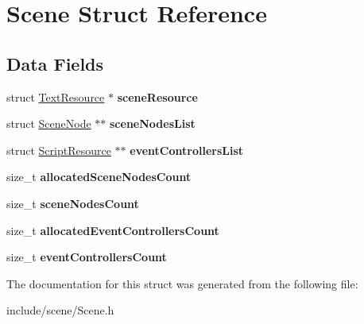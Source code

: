\hypertarget{struct_scene}{}\section{Scene Struct Reference}
\label{struct_scene}
\subsection*{Data Fields}
\begin{DoxyCompactItemize}
\item 
\hypertarget{struct_scene_a21ff815316283aacca9aa1a2946f2e44}{}\label{struct_scene_a21ff815316283aacca9aa1a2946f2e44} 
struct \hyperlink{struct_text_resource}{Text\+Resource} $\ast$ {\bfseries scene\+Resource}
\item 
\hypertarget{struct_scene_a5c2a731f55f56cdcfa5c21e60ccbb6e4}{}\label{struct_scene_a5c2a731f55f56cdcfa5c21e60ccbb6e4} 
struct \hyperlink{struct_scene_node}{Scene\+Node} $\ast$$\ast$ {\bfseries scene\+Nodes\+List}
\item 
\hypertarget{struct_scene_ad4b3987f8cf701755a371f80578a908d}{}\label{struct_scene_ad4b3987f8cf701755a371f80578a908d} 
struct \hyperlink{struct_script_resource}{Script\+Resource} $\ast$$\ast$ {\bfseries event\+Controllers\+List}
\item 
\hypertarget{struct_scene_a07444dae294959bed34558e3477a76c6}{}\label{struct_scene_a07444dae294959bed34558e3477a76c6} 
size\+\_\+t {\bfseries allocated\+Scene\+Nodes\+Count}
\item 
\hypertarget{struct_scene_a11cef9a0dcadd4d0fb4b18f1f214fed0}{}\label{struct_scene_a11cef9a0dcadd4d0fb4b18f1f214fed0} 
size\+\_\+t {\bfseries scene\+Nodes\+Count}
\item 
\hypertarget{struct_scene_a6140a3bd288e2079c3f28f30246c41a6}{}\label{struct_scene_a6140a3bd288e2079c3f28f30246c41a6} 
size\+\_\+t {\bfseries allocated\+Event\+Controllers\+Count}
\item 
\hypertarget{struct_scene_ab2cf0332471e9bed9ab7792892fafbf0}{}\label{struct_scene_ab2cf0332471e9bed9ab7792892fafbf0} 
size\+\_\+t {\bfseries event\+Controllers\+Count}
\end{DoxyCompactItemize}


The documentation for this struct was generated from the following file\+:\begin{DoxyCompactItemize}
\item 
include/scene/Scene.\+h\end{DoxyCompactItemize}
